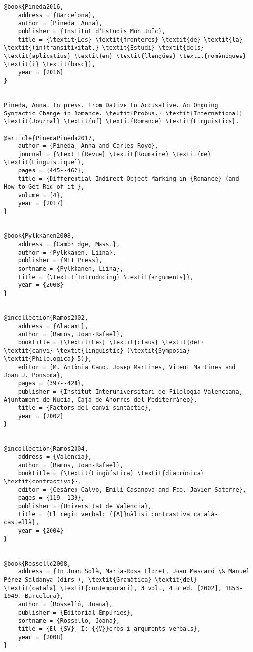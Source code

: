 \documentclass[output=paper,modfonts,nonflat]{langsci/langscibook}
\begin{document}
\begin{verbatim}
@book{Pineda2016,
	address = {Barcelona},
	author = {Pineda, Anna},
	publisher = {Institut d’Estudis Món Juïc},
	title = {\textit{Les} \textit{fronteres} \textit{de} \textit{la} \textit{(in)transitivitat.} \textit{Estudi} \textit{dels} \textit{aplicatius} \textit{en} \textit{llengües} \textit{romàniques} \textit{i} \textit{basc}},
	year = {2016}
}


Pineda, Anna. In press. From Dative to Accusative. An Ongoing Syntactic Change in Romance. \textit{Probus.} \textit{International} \textit{Journal} \textit{of} \textit{Romance} \textit{Linguistics}.

@article{PinedaPineda2017,
	author = {Pineda, Anna and Carles Royo},
	journal = {\textit{Revue} \textit{Roumaine} \textit{de} \textit{Linguistique}},
	pages = {445--462},
	title = {Differential Indirect Object Marking in {Romance} (and How to Get Rid of it)},
	volume = {4},
	year = {2017}
}


@book{Pylkkänen2008,
	address = {Cambridge, Mass.},
	author = {Pylkkänen, Liina},
	publisher = {MIT Press},
	sortname = {Pylkkanen, Liina},
	title = {\textit{Introducing} \textit{arguments}},
	year = {2008}
}


@incollection{Ramos2002,
	address = {Alacant},
	author = {Ramos, Joan-Rafael},
	booktitle = {\textit{Les} \textit{claus} \textit{del} \textit{canvi} \textit{lingüístic} (\textit{Symposia} \textit{Philologica} 5)},
	editor = {M. Antònia Cano, Josep Martines, Vicent Martines and Joan J. Ponsoda},
	pages = {397--428},
	publisher = {Institut Interuniversitari de Filologia Valenciana, Ajuntament de Nucia, Caja de Ahorros del Mediterráneo},
	title = {Factors del canvi sintàctic},
	year = {2002}
}


@incollection{Ramos2004,
	address = {València},
	author = {Ramos, Joan-Rafael},
	booktitle = {\textit{Lingüística} \textit{diacrònica} \textit{contrastiva}},
	editor = {Cesáreo Calvo, Emili Casanova and Fco. Javier Satorre},
	pages = {119--139},
	publisher = {Universitat de València},
	title = {El règim verbal: {{A}}nàlisi contrastiva català-castellà},
	year = {2004}
}


@book{Rosselló2008,
	address = {In Joan Solà, Maria-Rosa Lloret, Joan Mascaró \& Manuel Pérez Saldanya (dirs.), \textit{Gramàtica} \textit{del} \textit{català} \textit{contemporani}, 3 vol., 4th ed. [2002], 1853-1949. Barcelona},
	author = {Rosselló, Joana},
	publisher = {Editorial Empúries},
	sortname = {Rossello, Joana},
	title = {El {SV}, I: {{V}}erbs i arguments verbals},
	year = {2008}
}



\end{verbatim}
\end{document}
